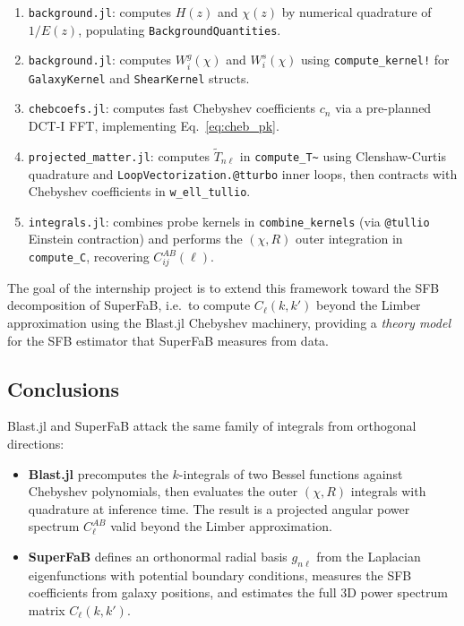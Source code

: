 \begin{enumerate}
    \item \texttt{background.jl}: computes $H(z)$ and $\chi(z)$
    by numerical quadrature of $1/E(z)$, populating
    \texttt{BackgroundQuantities}.
    \item \texttt{background.jl}: computes $W_i^g(\chi)$ and
    $W_i^s(\chi)$ using \texttt{compute\_kernel!} for
    \texttt{GalaxyKernel} and \texttt{ShearKernel} structs.
    \item \texttt{chebcoefs.jl}: computes fast Chebyshev
    coefficients $c_n$ via a pre-planned DCT-I FFT,
    implementing Eq.~\eqref{eq:cheb_pk}.
    \item \texttt{projected\_matter.jl}: computes $\tilde{T}_{n\ell}$
    in \texttt{compute\_T\~{}} using Clenshaw-Curtis quadrature and
    \texttt{LoopVectorization.@tturbo} inner loops, then contracts
    with Chebyshev coefficients in \texttt{w\_ell\_tullio}.
    \item \texttt{integrals.jl}: combines probe kernels in
    \texttt{combine\_kernels} (via \texttt{@tullio} Einstein
    contraction) and performs the $(\chi, R)$ outer integration in
    \texttt{compute\_C\ell}, recovering $C_{ij}^{AB}(\ell)$.
\end{enumerate}

The goal of the internship project is to extend this framework toward
the SFB decomposition of SuperFaB, i.e.\ to compute
$C_\ell(k,k')$ beyond the Limber approximation using the Blast.jl
Chebyshev machinery, providing a \emph{theory model} for the SFB
estimator that SuperFaB measures from data.

\subsection{Conclusions}

Blast.jl and SuperFaB attack the same family of integrals from
orthogonal directions:

\begin{itemize}
    \item \textbf{Blast.jl} precomputes the $k$-integrals of two
    Bessel functions against Chebyshev polynomials, then evaluates
    the outer $(\chi,R)$ integrals with quadrature at inference time.
    The result is a projected angular power spectrum $C_\ell^{AB}$
    valid beyond the Limber approximation.

    \item \textbf{SuperFaB} defines an orthonormal radial basis
    $g_{n\ell}$ from the Laplacian eigenfunctions with potential
    boundary conditions, measures the SFB coefficients from galaxy
    positions, and estimates the full 3D power spectrum matrix
    $C_\ell(k,k')$.
\end{itemize}

